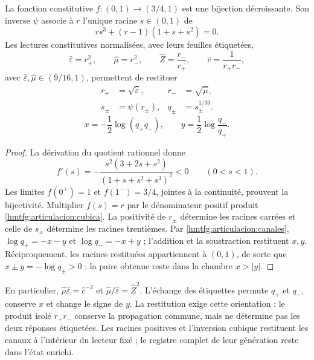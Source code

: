\begin{proposition}
\label{hmtfg:articulacion:inversion}
La fonction constitutive \(f:(0,1)\to(3/4,1)\) est une bijection
décroissante. Son inverse \(\psi\) associe à \(r\) l’unique racine
\(s\in(0,1)\) de
\begin{equation}
 r s^3+(r-1)(1+s+s^2)=0.
 \label{hmtfg:articulacion:cubica}
\end{equation}
Les lectures constitutives normalisées, avec leurs feuilles étiquetées,
\[
 \widehat\varepsilon=r_+^2,\qquad
 \widehat\mu=r_-^2,\qquad
 \widehat Z=\frac{r_-}{r_+},\qquad
 \widehat c=\frac1{r_+r_-},
\]
avec \(\widehat\varepsilon,\widehat\mu\in(9/16,1)\), permettent de restituer
\begin{equation}
 \begin{aligned}
 r_+&=\sqrt{\widehat\varepsilon},&
 r_-&=\sqrt{\widehat\mu},\\
 s_\pm&=\psi(r_\pm),& q_\pm&=s_\pm^{1/30}.
 \end{aligned}
 \label{hmtfg:articulacion:recuperacion-canales}
\end{equation}
\begin{equation}
 x=-\frac12\log(q_+q_-),\qquad
 y=\frac12\log\frac{q_-}{q_+}.
 \label{hmtfg:articulacion:recuperacion-angular}
\end{equation}
\end{proposition}
\begin{proof}
La dérivation du quotient rationnel donne
\begin{equation}
 f'(s)=-\frac{s^2(3+2s+s^2)}{(1+s+s^2+s^3)^2}<0
 \qquad(0<s<1).
 \label{hmtfg:articulacion:monotonia}
\end{equation}
Les limites \(f(0^+)=1\) et \(f(1^-)=3/4\), jointes à la
continuité, prouvent la bijectivité. Multiplier \(f(s)=r\) par
le dénominateur positif produit \eqref{hmtfg:articulacion:cubica}.
La positivité de \(r_\pm\) détermine les racines carrées
et celle de \(s_\pm\) détermine les racines trentièmes.
Par \eqref{hmtfg:articulacion:canales},
\(\log q_+=-x-y\) et \(\log q_-=-x+y\) ;
l’addition et la soustraction restituent \(x,y\).
Réciproquement, les racines restituées appartiennent à \((0,1)\),
de sorte que \(x\pm y=-\log q_\pm>0\) ; la paire obtenue
reste dans la chambre \(x>|y|\).
\end{proof}

En particulier,
\(\widehat\mu\widehat\varepsilon=\widehat c^{-2}\) et
\(\widehat\mu/\widehat\varepsilon=\widehat Z^2\).
L’échange des étiquettes permute \(q_+\) et \(q_-\),
conserve \(x\) et change le signe de \(y\). La restitution
exige cette orientation : le produit isolé \(r_+r_-\)
conserve la propagation commune, mais ne détermine pas les deux réponses
étiquetées. Les racines positives et l’inversion cubique restituent
les canaux à l’intérieur du lecteur fixé ; le registre complet de leur
génération reste dans l’état enrichi.

